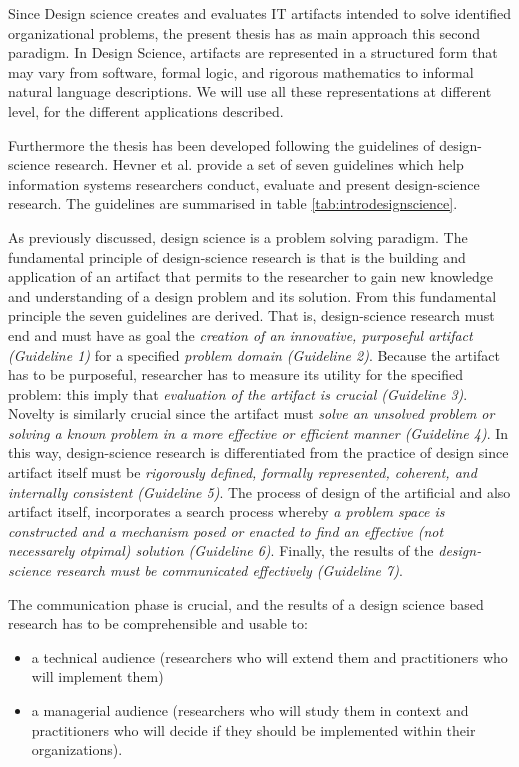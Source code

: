 \documentclass[b5paper,]{book}
\providecommand{\tightlist}{%
  \setlength{\itemsep}{0pt}\setlength{\parskip}{0pt}}
\theoremstyle{definition}
\theoremstyle{definition}
\theoremstyle{definition}
\theoremstyle{remark}
\begin{document}
Since Design science creates and evaluates IT artifacts intended to
solve identified organizational problems, the present thesis has as main
approach this second paradigm. In Design Science, artifacts are
represented in a structured form that may vary from software, formal
logic, and rigorous mathematics to informal natural language
descriptions. We will use all these representations at different level,
for the different applications described.

Furthermore the thesis has been developed following the guidelines of
design-science research. Hevner et al. \citep{bichler2006design} provide
a set of seven guidelines which help information systems researchers
conduct, evaluate and present design-science research. The guidelines
are summarised in table \ref{tab:introdesignscience}.

As previously discussed, design science is a problem solving paradigm.
The fundamental principle of design-science research is that is the
building and application of an artifact that permits to the researcher
to gain new knowledge and understanding of a design problem and its
solution. From this fundamental principle the seven guidelines are
derived. That is, design-science research must end and must have as goal
the \emph{creation of an innovative, purposeful artifact (Guideline 1)}
for a specified \emph{problem domain (Guideline 2)}. Because the
artifact has to be purposeful, researcher has to measure its utility for
the specified problem: this imply that \emph{evaluation of the artifact
is crucial (Guideline 3)}. Novelty is similarly crucial since the
artifact must \emph{solve an unsolved problem or solving a known problem
in a more effective or efficient manner (Guideline 4)}. In this way,
design-science research is differentiated from the practice of design
since artifact itself must be \emph{rigorously defined, formally
represented, coherent, and internally consistent (Guideline 5)}. The
process of design of the artificial and also artifact itself,
incorporates a search process whereby \emph{a problem space is
constructed and a mechanism posed or enacted to find an effective (not
necessarely otpimal) solution (Guideline 6)}. Finally, the results of
the \emph{design-science research must be communicated effectively
(Guideline 7)}.

The communication phase is crucial, and the results of a design science
based research has to be comprehensible and usable to:

\begin{itemize}
\tightlist
\item
  a technical audience (researchers who will extend them and
  practitioners who will implement them)
\item
  a managerial audience (researchers who will study them in context and
  practitioners who will decide if they should be implemented within
  their organizations).
\end{itemize}
\end{document}
